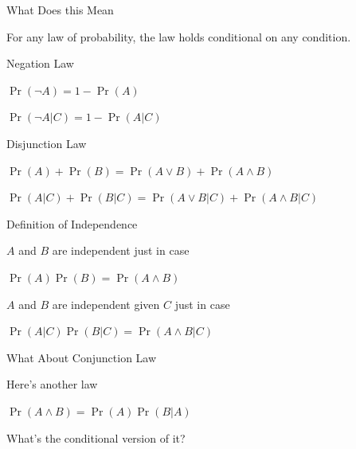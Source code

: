 \documentclass[
  ignorenonframetext,
]{beamer}
\providecommand{\tightlist}{%
  \setlength{\itemsep}{0pt}\setlength{\parskip}{0pt}}
\renewcommand{\,}{\text{, }}
\renewenvironment*{quote}	
	{\list{}{\rightmargin   \leftmargin} \item } 	
	{\endlist }
\begin{document}
\begin{frame}{What Does this Mean}
\protect\hypertarget{what-does-this-mean}{}

For any law of probability, the law holds conditional on any condition.

\end{frame}

\begin{frame}{Negation Law}
\protect\hypertarget{negation-law}{}

\begin{description}
\tightlist
\item[Unconditional]
\(\Pr(\neg A) = 1 - \Pr(A)\)
\item[Conditional]
\(\Pr(\neg A | C) = 1 - \Pr(A | C)\)
\end{description}

\end{frame}

\begin{frame}{Disjunction Law}
\protect\hypertarget{disjunction-law}{}

\begin{description}
\tightlist
\item[Unconditional]
\(\Pr(A) + \Pr(B) = \Pr(A \vee B) + \Pr(A \wedge B)\)
\item[Conditional]
\(\Pr(A | C) + \Pr(B | C) = \Pr(A \vee B | C) + \Pr(A \wedge B | C)\)
\end{description}

\end{frame}

\begin{frame}{Definition of Independence}
\protect\hypertarget{definition-of-independence}{}

\(A\) and \(B\) are independent just in case

\begin{quote}
\(\Pr(A)\Pr(B) = \Pr(A \wedge B)\) \pause
\end{quote}

\(A\) and \(B\) are independent given \(C\) just in case

\begin{quote}
\(\Pr(A | C)\Pr(B | C) = \Pr(A \wedge B | C)\) \pause
\end{quote}

\end{frame}

\begin{frame}{What About Conjunction Law}
\protect\hypertarget{what-about-conjunction-law}{}

Here's another law

\begin{description}
\tightlist
\item[Unconditional]
\(\Pr(A \wedge B) = \Pr(A)\Pr(B | A)\)
\end{description}

What's the conditional version of it?

\end{frame}
\end{document}
